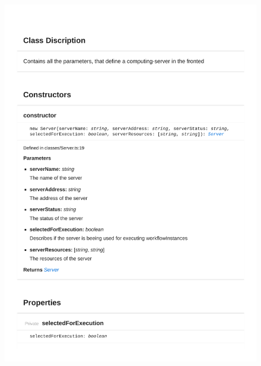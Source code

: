 \begin{figure}[H]
\centerline{\includegraphics[width=\textwidth]{FrontendDocsAsPDF/Classes/Server.pdf}}
\end{figure}

